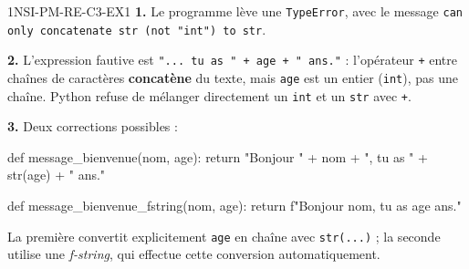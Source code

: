 \begin{corrige}{1NSI-PM-RE-C3-EX1}
\textbf{1.} Le programme lève une \lstinline{TypeError}, avec le message
\lstinline{can only concatenate str (not "int") to str}.

\textbf{2.} L'expression fautive est \lstinline{"... tu as " + age + " ans."} :
l'opérateur \lstinline{+} entre chaînes de caractères \textbf{concatène} du texte, mais
\lstinline{age} est un entier (\lstinline{int}), pas une chaîne. Python refuse de mélanger
directement un \lstinline{int} et un \lstinline{str} avec \lstinline{+}.

\textbf{3.} Deux corrections possibles :
\begin{python}
def message_bienvenue(nom, age):
    return "Bonjour " + nom + ", tu as " + str(age) + " ans."

def message_bienvenue_fstring(nom, age):
    return f"Bonjour {nom}, tu as {age} ans."
\end{python}
La première convertit explicitement \lstinline{age} en chaîne avec \lstinline{str(...)} ;
la seconde utilise une \emph{f-string}, qui effectue cette conversion automatiquement.
\end{corrige}
